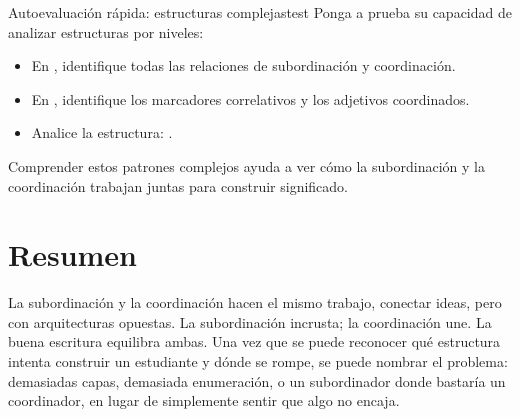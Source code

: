 \begin{tblsframedsymbol}{Autoevaluación rápida: estructuras complejas}{test}
Ponga a prueba su capacidad de analizar estructuras por niveles:
\begin{itemize}[noitemsep, leftmargin=*]
    \item En , identifique todas las relaciones de subordinación y coordinación.
    \item En , identifique los marcadores correlativos y los adjetivos coordinados.
    \item Analice la estructura: .
\end{itemize}
Comprender estos patrones complejos ayuda a ver cómo la subordinación y la coordinación trabajan juntas para construir significado.
\end{tblsframedsymbol}

\section{Resumen}

La subordinación y la coordinación hacen el mismo trabajo, conectar ideas, pero con arquitecturas opuestas. La subordinación incrusta; la coordinación une. La buena escritura equilibra ambas. Una vez que se puede reconocer qué estructura intenta construir un estudiante y dónde se rompe, se puede nombrar el problema: demasiadas capas, demasiada enumeración, o un subordinador donde bastaría un coordinador, en lugar de simplemente sentir que algo no encaja.
